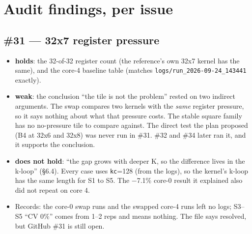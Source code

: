 \documentclass[10pt,a4paper]{article}
\newcommand{\ok}{\textcolor{green!45!black}{\textbf{holds}}}
\newcommand{\weak}{\textcolor{orange!80!black}{\textbf{weak}}}
\newcommand{\bad}{\textcolor{red!70!black}{\textbf{does not hold}}}
\begin{document}
\section{Audit findings, per issue}

\subsection*{\#31 --- 32x7 register pressure}
\begin{itemize}
  \item \ok: the 32-of-32 register count (the reference's own 32x7 kernel has the same), and the
  core-4 baseline table (matches \texttt{logs/run\_2026-09-24\_143441} exactly).
  \item \weak: the conclusion ``the tile is not the problem'' rested on two indirect arguments. The
  swap compares two kernels with the \emph{same} register pressure, so it says nothing about what that
  pressure costs. The stable square family has no no-pressure tile to compare against. The direct test
  the plan proposed (B4 at 32x6 and 32x8) was never run in \#31. \#32 and \#34 later ran it, and it
  supports the conclusion.
  \item \bad: ``the gap grows with deeper K, so the difference lives in the k-loop'' (\S6.4). Every case
  uses \texttt{kc}=128 (from the logs), so the kernel's k-loop has the same length for S1 to S5. The
  $-$7.1\% core-0 result it explained also did not repeat on core 4.
  \item Records: the core-0 swap runs and the swapped core-4 runs left no logs; S3--S5 ``CV 0\%'' comes
  from 1--2 reps and means nothing. The file says resolved, but GitHub \#31 is still open.
\end{itemize}
\end{document}
